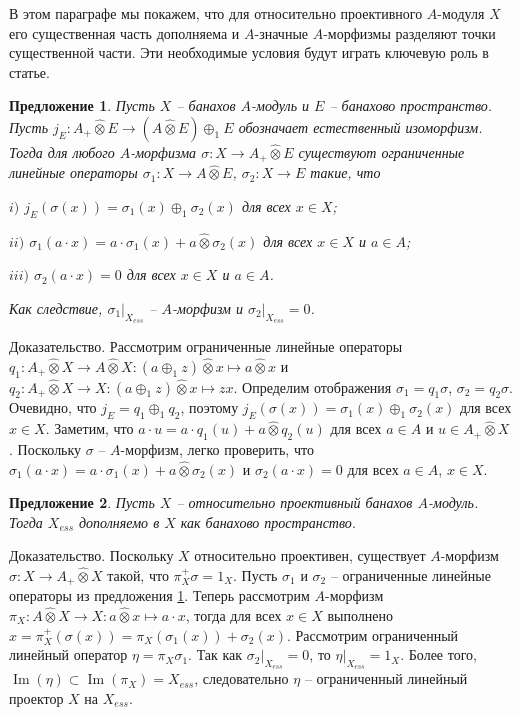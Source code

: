 \documentclass[12pt]{article}
\numberwithin{equation}{subsection}
\theoremstyle{plain}
\newtheorem{proposition}{Предложение}
\newenvironment{proof}{Доказательство.}{}
\newcommand{\projtens}{\mathbin{\widehat{\otimes}}}
\begin{document}
\begin{fulltext}
    В этом параграфе мы покажем, что для относительно проективного $A$-модуля $X$ его существенная часть дополняема и $A$-значные $A$-морфизмы разделяют точки существенной части. Эти необходимые условия будут играть ключевую роль в статье.

    \begin{proposition}\label{MorphDecomp} Пусть $X$ -- банахов $A$-модуль и $E$ -- банахово пространство. Пусть $j_E:A_+\projtens E\to (A\projtens E)\oplus_1 E$ обозначает естественный изоморфизм. Тогда для любого $A$-морфизма $\sigma:X\to A_+\projtens E$ существуют ограниченные линейные операторы $\sigma_1:X\to A\projtens E$, $\sigma_2:X\to E$ такие, что

        $i)$ $j_E(\sigma(x))=\sigma_1(x)\oplus_1 \sigma_2(x)$ для всех $x\in X$;

        $ii)$ $\sigma_1(a\cdot x)=a\cdot \sigma_1(x)+a\projtens \sigma_2(x)$ для всех $x\in X$ и $a\in A$;

        $iii)$ $\sigma_2(a\cdot x)=0$ для всех $x\in X$ и $a\in A$.

        \noindent
        Как следствие, $\sigma_1|_{X_{ess}}$ -- $A$-морфизм и $\sigma_2|_{X_{ess}}=0$.

    \end{proposition}
    \begin{proof} Рассмотрим ограниченные линейные операторы
        $q_1:A_+\projtens X\to A\projtens X: (a\oplus_1 z)\projtens x\mapsto a\projtens x$ и
        $q_2:A_+\projtens X\to X: (a\oplus_1 z)\projtens x\mapsto z x$. Определим отображения $\sigma_1=q_1\sigma$, $\sigma_2=q_2\sigma$. Очевидно, что $j_E=q_1\oplus_1 q_2$, поэтому $j_E(\sigma(x))=\sigma_1(x)\oplus_1 \sigma_2(x)$ для всех $x\in X$. Заметим, что $a\cdot u=a\cdot q_1(u)+a\projtens q_2(u)$ для всех $a\in A$ и $u\in A_+\projtens X$. Поскольку $\sigma$ -- $A$-морфизм, легко проверить, что $\sigma_1(a\cdot x)=a\cdot \sigma_1(x)+a\projtens \sigma_2(x)$ и $\sigma_2(a\cdot x)=0$ для всех $a\in A$, $x\in X$.
    \end{proof}

    \begin{proposition}\label{ProjModEssPartCompl} Пусть $X$ -- относительно проективный банахов $A$-модуль. Тогда $X_{ess}$ дополняемо в $X$ как банахово пространство.
    \end{proposition}
    \begin{proof} Поскольку $X$ относительно проективен, существует $A$-морфизм $\sigma:X\to A_+\projtens X$ такой, что $\pi_X^+\sigma=1_X$. Пусть $\sigma_1$ и $\sigma_2$ -- ограниченные линейные операторы из предложения \ref{MorphDecomp}. Теперь рассмотрим $A$-морфизм $\pi_X:A\projtens X\to X:a\projtens x\mapsto a\cdot x$, тогда для всех $x\in X$ выполнено $x=\pi_X^+(\sigma(x))=\pi_X(\sigma_1(x)) + \sigma_2(x)$. Рассмотрим ограниченный линейный оператор $\eta = \pi_X\sigma_1$. Так как $\sigma_2|_{X_{ess}}=0$, то $\eta|_{X_{ess}}=1_X$. Более того, $\operatorname{Im}(\eta)\subset\operatorname{Im}(\pi_X)=X_{ess}$, следовательно $\eta$ -- ограниченный линейный проектор $X$ на $X_{ess}$.
    \end{proof}


\end{fulltext}
\end{document}
